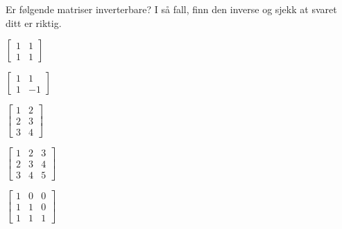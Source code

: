 \begin{oppgave}
Er følgende matriser inverterbare? I så fall, finn den inverse og sjekk at svaret ditt er riktig. 

\begin{punkt}
$\begin{bmatrix}
1 & 1\\
1 & 1
\end{bmatrix}$
\end{punkt}

\begin{punkt}
$\begin{bmatrix}
1 & 1\\
1 & -1
\end{bmatrix}$
\end{punkt}

\begin{punkt}
$\begin{bmatrix}
1 & 2\\
2 & 3\\
3 & 4
\end{bmatrix}$
\end{punkt}

\begin{punkt}
$\begin{bmatrix}
1 & 2 & 3\\
2 & 3 & 4\\
3 & 4 & 5
\end{bmatrix}$
\end{punkt}

\begin{punkt}
$\begin{bmatrix}
1 & 0 & 0\\
1 & 1 & 0\\
1 & 1 & 1
\end{bmatrix}$
\end{punkt}


\end{oppgave}


